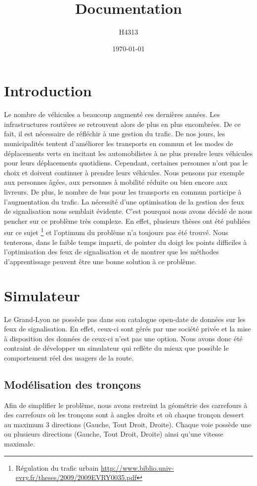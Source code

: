 \documentclass[11pt]{article}
\title{Documentation}
\author{H4313}
\date{\today}
\begin{document}
\maketitle
\tableofcontents
\newpage

\section{Introduction}
Le nombre de véhicules a beaucoup augmenté ces dernières années. Les infrastructures routières se retrouvent alors de plus en plus encombrées. De ce fait, il est nécessaire de réfléchir à une gestion du trafic. De nos jours, les municipalités tentent d'améliorer les transports en commun et les modes de déplacements verts en incitant les automobilistes à ne plus prendre leurs véhicules pour leurs déplacements quotidiens. Cependant, certaines personnes n'ont pas le choix et doivent continuer à prendre leurs véhicules. Nous pensons par exemple aux personnes âgées, aux personnes à mobilité réduite ou bien encore aux livreurs. De plus, le nombre de bus pour les transports en commun participe à l'augmentation du trafic. La nécessité d'une optimisation de la gestion des feux de signalisation nous semblait évidente. C'est pourquoi nous avons décidé de nous pencher sur ce problème très complexe. En effet, plusieurs thèses ont été publiées sur ce sujet \footnote{Régulation du trafic urbain \url{http://www.biblio.univ-evry.fr/theses/2009/2009EVRY0035.pdf}} et l'optimum du problème n'a toujours pas été trouvé. Nous tenterons, dans le faible temps imparti, de pointer du doigt les points difficiles à l'optimisation des feux de signalisation et de montrer que les méthodes d'apprentissage peuvent être une bonne solution à ce problème.

\section{Simulateur}
Le Grand-Lyon ne possède pas dans son catalogue open-date de données sur les feux de signalisation. En effet, ceux-ci sont gérés par une société privée et la mise à disposition des données de ceux-ci n'est pas une option. Nous avons donc été contraint de développer un simulateur qui reflète du mieux que possible le comportement réel des usagers de la route.

\subsection{Modélisation des tronçons}
Afin de simplifier le problème, nous avons restreint la géométrie des carrefours à des carrefours où les tronçons sont à angles droits et où chaque tronçon dessert au maximum 3 directions (Gauche, Tout Droit, Droite). Chaque voie possède une ou plusieurs directions (Gauche, Tout Droit, Droite) ainsi qu'une vitesse maximale. 
\end{document}
